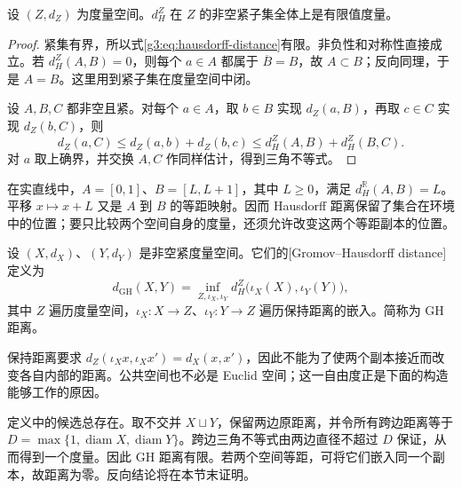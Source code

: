 \begin{proposition}\label{g3:prop:hausdorff-metric}
	设 \((Z,d_Z)\) 为度量空间。\(d_H^Z\) 在 \(Z\) 的非空紧子集全体上是有限值度量。
\end{proposition}
\begin{proof}
	紧集有界，所以式\eqref{g3:eq:hausdorff-distance}有限。非负性和对称性直接成立。若 \(d_H^Z(A,B)=0\)，则每个 \(a\in A\) 都属于 \(\overline B=B\)，故 \(A\subset B\)；反向同理，于是 \(A=B\)。这里用到紧子集在度量空间中闭。

	设 \(A,B,C\) 都非空且紧。对每个 \(a\in A\)，取 \(b\in B\) 实现 \(d_Z(a,B)\)，再取 \(c\in C\) 实现 \(d_Z(b,C)\)，则
	\[
		d_Z(a,C)\le d_Z(a,b)+d_Z(b,c)
		\le d_H^Z(A,B)+d_H^Z(B,C).
	\]
	对 \(a\) 取上确界，并交换 \(A,C\) 作同样估计，得到三角不等式。
\end{proof}

\begin{example}\label{g3:exm:hausdorff-position}
	在实直线中，\(A=[0,1]\)、\(B=[L,L+1]\)，其中 \(L\ge0\)，满足 \(d_H^{\mathbb R}(A,B)=L\)。平移 \(x\mapsto x+L\) 又是 \(A\) 到 \(B\) 的等距映射。因而 Hausdorff 距离保留了集合在环境中的位置；要只比较两个空间自身的度量，还须允许改变这两个等距副本的位置。
\end{example}

\begin{definition}\label{g3:def:gh-distance}
	设 \((X,d_X)\)、\((Y,d_Y)\) 是非空紧度量空间。它们的[Gromov--Hausdorff distance]定义为
	\begin{equation}\label{g3:eq:gh-distance-ambient}
		d_{\mathrm{GH}}(X,Y)
		=\inf_{Z,\iota_X,\iota_Y}
		d_H^Z\bigl(\iota_X(X),\iota_Y(Y)\bigr),
	\end{equation}
	其中 \(Z\) 遍历度量空间，\(\iota_X:X\to Z\)、\(\iota_Y:Y\to Z\) 遍历保持距离的嵌入。简称为 GH 距离。
\end{definition}

保持距离要求 \(d_Z(\iota_Xx,\iota_Xx')=d_X(x,x')\)，因此不能为了使两个副本接近而改变各自内部的距离。公共空间也不必是 Euclid 空间；这一自由度正是下面的构造能够工作的原因。

\ProseParagraphBreak

定义中的候选总存在。取不交并 \(X\sqcup Y\)，保留两边原距离，并令所有跨边距离等于 \(D=\max\{1,\operatorname{diam}X,\operatorname{diam}Y\}\)。跨边三角不等式由两边直径不超过 \(D\) 保证，从而得到一个度量。因此 GH 距离有限。若两个空间等距，可将它们嵌入同一个副本，故距离为零。反向结论将在本节末证明。

